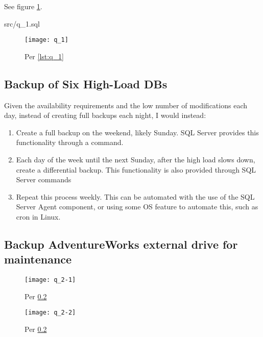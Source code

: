 See figure \ref{fig:q_1}. \label{sec:q_1}

\begin{lstinputlisting}[float, label={lst:q_1}, caption={per \ref{sec:q_1}}]{src/q_1.sql}
\end{lstinputlisting}
\begin{figure}[H]\centering
	\caption{Per \ref{lst:q_1}}
	\texttt{[image: q\_1]}
	\label{fig:q_1}
\end{figure}


\hypertarget{backup-of-six-high-load-dbs}{%
\subsection{Backup of Six High-Load
DBs}\label{backup-of-six-high-load-dbs}}

Given the availability requirements and the low number of modifications
each day, instead of creating full backups each night, I would instead:

\begin{enumerate}
\def\labelenumi{\arabic{enumi}.}
\item
  Create a full backup on the weekend, likely Sunday. SQL Server
  provides this functionality through a command.
\item
  Each day of the week until the next Sunday, after the high load slows
  down, create a differential backup. This functionality is also
  provided through SQL Server commands
\item
  Repeat this process weekly. This can be automated with the use of the
  SQL Server Agent component, or using some OS feature to automate this,
  such as cron in Linux.
\end{enumerate}

\hypertarget{backup-adventureworks-external-drive-for-maintenance}{%
\subsection{Backup AdventureWorks external drive for
maintenance}\label{backup-adventureworks-external-drive-for-maintenance}}

\begin{figure}[H]\centering
	\caption{Per \ref{backup-adventureworks-external-drive-for-maintenance}}
	\texttt{[image: q\_2-1]}
	\label{fig:q_2-1}
\end{figure}

\begin{figure}[H]\centering
	\caption{Per \ref{backup-adventureworks-external-drive-for-maintenance}}
	\texttt{[image: q\_2-2]}
	\label{fig:q_2-2}
\end{figure}


